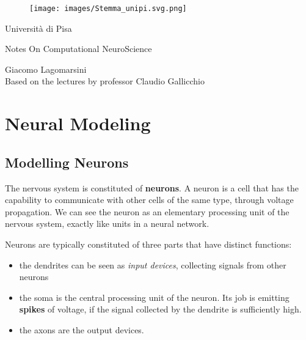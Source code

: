 \documentclass[oneside]{book}
\theoremstyle{definition}
\theoremstyle{plain}
\begin{document}
\begin{titlepage}
	\begin{figure}[h]
		\centering
		\texttt{[image: images/Stemma\_unipi.svg.png]}
		
	\end{figure}
	\begin{center}
		\LARGE{\sc Università di Pisa}
		
	\end{center}
	
	\vspace{15mm}
	\begin{center}
		\LARGE{\sc Notes On Computational NeuroScience}
	\end{center}
	
	
	
	\vspace{30mm}
	\begin{center}
	   \LARGE{Giacomo Lagomarsini\\
    \vspace{10mm}
        Based on the lectures by professor Claudio Gallicchio  }
	\end{center}
	
	
	
\end{titlepage}


\tableofcontents
\newpage
\chapter{Neural Modeling}
\section{Modelling Neurons}
The nervous system is constituted of \textbf{neurons}. A neuron is a cell that has the capability to communicate with other cells of the same type, through voltage propagation.
We can see the neuron as an elementary processing unit of the nervous system, exactly like units in a neural network.

Neurons are typically constituted of three parts that have distinct functions:
\begin{itemize}
    \item the dendrites can be seen as \textit{input devices}, collecting signals from other neurons
    \item the soma is the central processing unit of the neuron. Its job is emitting \textbf{spikes} of voltage, if the signal collected by the dendrite is sufficiently high.
    \item the axons are the output devices. 
\end{itemize}
\end{document}
